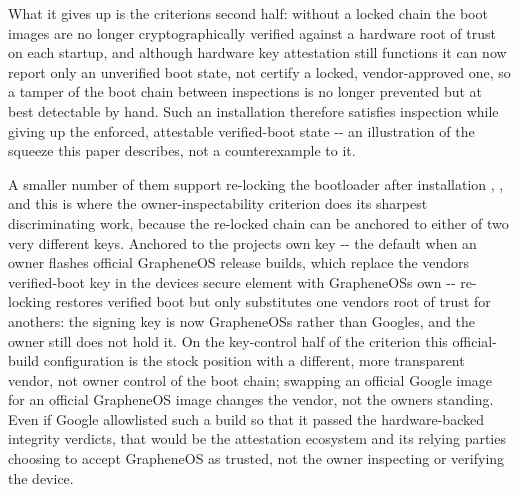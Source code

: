 \documentclass[
]{article}
\begin{document}
What it gives up is the criterion\textquotesingle s second half: without
a locked chain the boot images are no longer cryptographically verified
against a hardware root of trust on each startup, and although hardware
key attestation still functions it can now report only an unverified
boot state, not certify a locked, vendor-approved one, so a tamper of
the boot chain between inspections is no longer prevented but at best
detectable by hand. Such an installation therefore satisfies inspection
while giving up the enforced, attestable verified-boot state -\/- an
illustration of the squeeze this paper describes, not a counterexample
to it.

A smaller number of them support re-locking the bootloader after
installation \citep{grapheneos-install-locking},
\citep{grapheneos-setup-wizard}, and this is where the
owner-inspectability criterion does its sharpest discriminating work,
because the re-locked chain can be anchored to either of two very
different keys. Anchored to the project\textquotesingle s own key -\/-
the default when an owner flashes official GrapheneOS release builds,
which replace the vendor\textquotesingle s verified-boot key in the
device\textquotesingle s secure element with
GrapheneOS\textquotesingle s own \citep{grapheneos-install-locking} -\/-
re-locking restores verified boot but only substitutes one
vendor\textquotesingle s root of trust for another\textquotesingle s:
the signing key is now GrapheneOS\textquotesingle s rather than
Google\textquotesingle s, and the owner still does not hold it. On the
key-control half of the criterion this official-build configuration is
the stock position with a different, more transparent vendor, not owner
control of the boot chain; swapping an official Google image for an
official GrapheneOS image changes the vendor, not the
owner\textquotesingle s standing. Even if Google allowlisted such a
build so that it passed the hardware-backed integrity verdicts, that
would be the attestation ecosystem and its relying parties choosing to
accept GrapheneOS as trusted, not the owner inspecting or verifying the
device.
\end{document}
